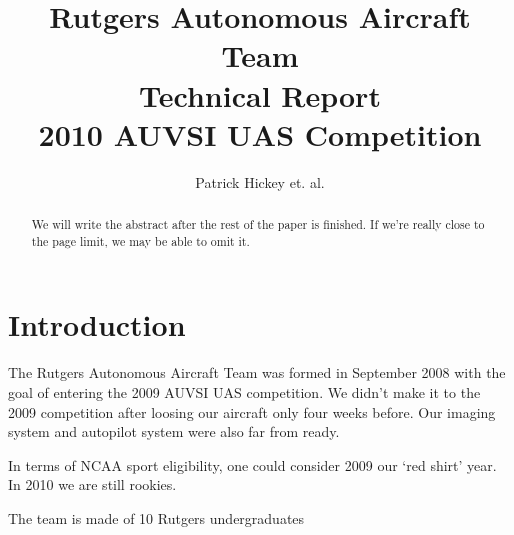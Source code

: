 \documentclass[10pt]{report}
\begin{document}
\title{Rutgers Autonomous Aircraft Team\\Technical Report\\2010 AUVSI UAS Competition}
\author{Patrick Hickey et. al.}


\begin{abstract}
We will write the abstract after the rest of the paper is finished. If we're really close to the page limit, we may be able to omit it.
\end{abstract}

\section{Introduction}

The Rutgers Autonomous Aircraft Team was formed in September 2008 with the goal of entering the 2009 AUVSI UAS competition. We didn't make it to the 2009 competition after loosing our aircraft only four weeks before. Our imaging system and autopilot system were also far from ready. 

In terms of NCAA sport eligibility, one could consider 2009 our `red shirt' year. In 2010 we are still rookies.

The team is made of 10 Rutgers undergraduates


\vspace{12 pt}
\end{document}
